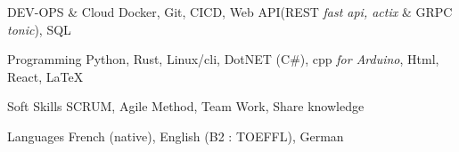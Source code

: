 

\begin{cvskills}

	\cvskill
	{DEV-OPS \& Cloud} %
	{Docker, Git, CICD, Web API(REST \textit{fast api, actix} \& GRPC \textit{tonic}), SQL} %

	\cvskill
	{Programming} %
	{Python, Rust, Linux/cli, DotNET (C\#), cpp \textit{for Arduino}, Html, React, LaTeX} %

	\cvskill
	{Soft Skills} %
	{SCRUM, Agile Method, Team Work, Share knowledge} %

	\cvskill
	{Languages} %
	{French (native), English (B2 : TOEFFL), German} %

\end{cvskills}
